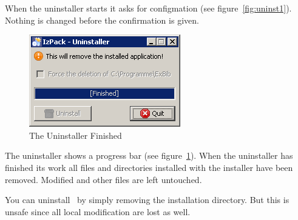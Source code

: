 When the uninstaller starts it asks for configmation (see
figure~\ref{fig:uninst1}). Nothing is changed before the confirmation
is given.

\begin{figure}[!ht]
  \centering
  \includegraphics[width=.45\textwidth]{img/uninst2}
  \caption{The Uninstaller Finished}
  \label{fig:uninst2}
\end{figure}

The uninstaller shows a progress bar (see figure~\ref{fig:uninst2}).
When the uninstaller has finished its work all files and directories
installed with the installer have been removed. Modified and other
files are left untouched.

You can uninstall \ExBib\ by simply removing the installation
directory.%
 But
this is unsafe since all local modification are lost as well.



\endinput
%
